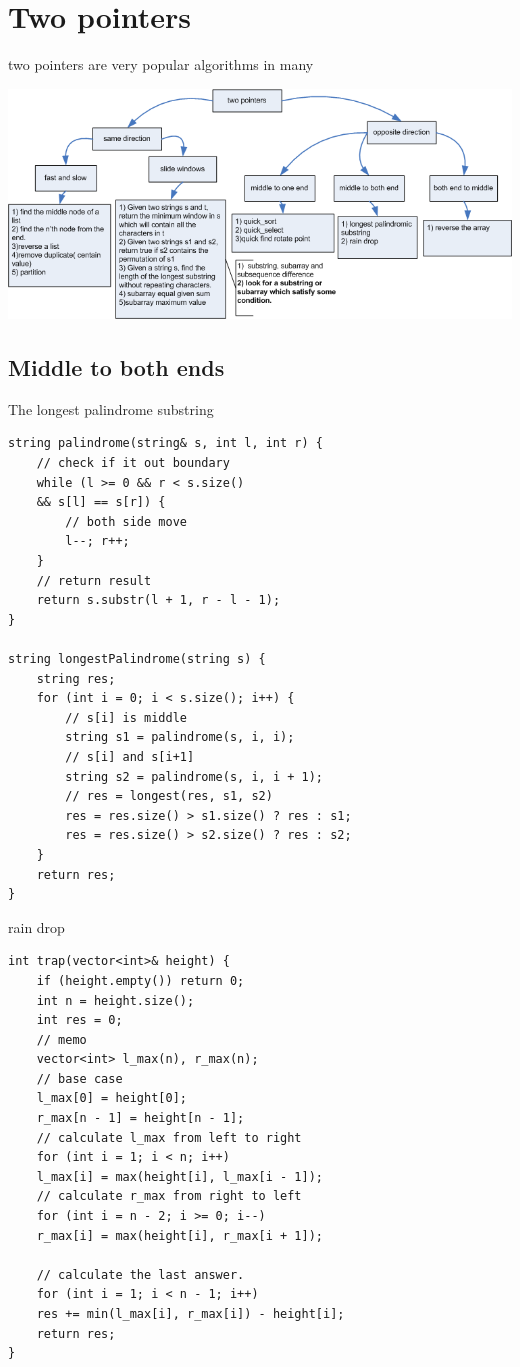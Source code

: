 \documentclass[a4paper,11pt,twoside]{book}
\begin{document}
\section{Two pointers}

\par two pointers are very popular algorithms in many 

\begin{center}
\includegraphics[scale=0.6]{pics/two_pointers.png}
\end{center}



\subsection{Middle to both ends}

	\par The longest palindrome substring
	
\begin{lstlisting}[breaklines]
string palindrome(string& s, int l, int r) {
	// check if it out boundary
	while (l >= 0 && r < s.size()
	&& s[l] == s[r]) {
		// both side move
		l--; r++;
	}
	// return result
	return s.substr(l + 1, r - l - 1);
}

string longestPalindrome(string s) {
	string res;
	for (int i = 0; i < s.size(); i++) {
		// s[i] is middle
		string s1 = palindrome(s, i, i);
		// s[i] and s[i+1] 
		string s2 = palindrome(s, i, i + 1);
		// res = longest(res, s1, s2)
		res = res.size() > s1.size() ? res : s1;
		res = res.size() > s2.size() ? res : s2;
	}
	return res;
}
\end{lstlisting}
	
	\par rain drop
	
\begin{lstlisting}[breaklines]
int trap(vector<int>& height) {
	if (height.empty()) return 0;
	int n = height.size();
	int res = 0;
	// memo
	vector<int> l_max(n), r_max(n);
	// base case
	l_max[0] = height[0];
	r_max[n - 1] = height[n - 1];
	// calculate l_max from left to right
	for (int i = 1; i < n; i++)
	l_max[i] = max(height[i], l_max[i - 1]);
	// calculate r_max from right to left
	for (int i = n - 2; i >= 0; i--) 
	r_max[i] = max(height[i], r_max[i + 1]);
	
	// calculate the last answer.
	for (int i = 1; i < n - 1; i++) 
	res += min(l_max[i], r_max[i]) - height[i];
	return res;
}
\end{lstlisting}
\end{document}

